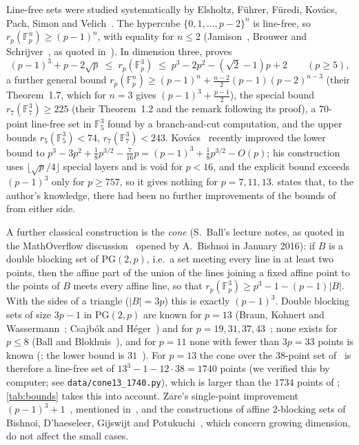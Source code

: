 \documentclass[11pt]{article}
\numberwithin{equation}{section}
\theoremstyle{definition}
\theoremstyle{remark}
\newcommand{\F}{\mathbb F}
\begin{document}
Line-free sets were studied systematically by Elsholtz, F\"uhrer, F\"uredi, Kov\'acs, Pach,
Simon and Velich~\cite{EFFKPSV}. The hypercube $\{0,1,\dots,p-2\}^n$ is line-free, so
$r_p(\F_p^n)\ge(p-1)^n$, with equality for $n\le 2$ (Jamison~\cite{Jamison}, Brouwer and
Schrijver~\cite{BrouwerSchrijver}, as quoted in~\cite{EFFKPSV}). In dimension three,
\cite{EFFKPSV} proves
\[
(p-1)^3+p-2\sqrt p\;\le\; r_p(\F_p^3)\;\le\; p^3-2p^2-(\sqrt2-1)p+2 \qquad(p\ge5),
\]
a further general bound $r_p(\F_p^n)\ge(p-1)^n+\frac{n-2}{2}(p-1)(p-2)^{n-3}$ (their Theorem~1.7,
which for $n=3$ gives $(p-1)^3+\frac{p-1}{2}$), the special bound $r_7(\F_7^3)\ge225$
(their Theorem~1.2 and the remark following its proof), a $70$-point line-free set in $\F_5^3$
found by a branch-and-cut computation, and the upper bounds $r_5(\F_5^3)<74$, $r_7(\F_7^3)<243$.
Kov\'acs~\cite{Kovacs} recently improved the lower bound to
$p^3-3p^2+\frac18p^{3/2}-\frac7{16}p=(p-1)^3+\frac18p^{3/2}-O(p)$; his construction uses
$\lfloor\sqrt p/4\rfloor$ special layers and is void for $p<16$, and the explicit bound exceeds
$(p-1)^3$ only for $p\ge757$, so it gives nothing for $p=7,11,13$. \cite{Kovacs} states that,
to the author's knowledge, there had been no further improvements of the bounds
of~\cite{EFFKPSV} from either side.

A further classical construction is the \emph{cone} (S.~Ball's lecture notes, as quoted in the
MathOverflow discussion~\cite{MO229442} opened by A.~Bishnoi in January 2016): if $B$ is a
double blocking set of $\mathrm{PG}(2,p)$, i.e.\ a set meeting every line in at least two points,
then the affine part of the union of the lines joining a fixed affine point to the points of $B$
meets every affine line, so that $r_p(\F_p^3)\ge p^3-1-(p-1)|B|$. With the sides of a triangle
($|B|=3p$) this is exactly $(p-1)^3$. Double blocking sets of size $3p-1$ in $\mathrm{PG}(2,p)$
are known for $p=13$ (Braun, Kohnert and Wassermann~\cite{BKW}; Csajb\'ok and
H\'eger~\cite{CsH}) and for $p=19,31,37,43$~\cite{CsH}; none exists for $p\le 8$ (Ball and
Blokhuis~\cite{BallBlokhuis}), and for $p=11$ none with fewer than $3p=33$ points is known
(\cite{CsH}; the lower bound is $31$~\cite{BallBlokhuis}). For $p=13$ the cone over the
$38$-point set of~\cite[\S4.1]{CsH} is therefore a line-free set of $13^3-1-12\cdot38=1740$
points (we verified this by computer; see \texttt{data/cone13\_1740.py}), which is larger than the
$1734$ points of
\cite[Thm.~1.1 and 1.7]{EFFKPSV}; \cref{tab:bounds} takes this into account. Zare's
single-point improvement $(p-1)^3+1$~\cite{MO229442}, mentioned in~\cite{EFFKPSV}, and the
constructions of affine $2$-blocking sets of Bishnoi, D'haeseleer, Gijswijt and
Potukuchi~\cite{BDGP}, which concern growing dimension, do not affect the small cases.
\end{document}
